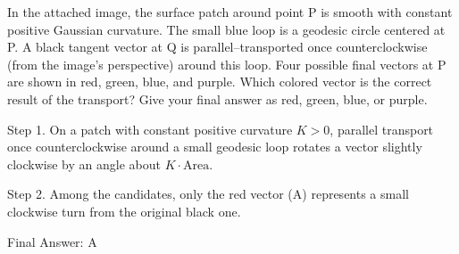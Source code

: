 In the attached image, the surface patch around point P is smooth with constant positive Gaussian curvature. The small blue loop is a geodesic circle centered at P. A black tangent vector at Q is parallel–transported once counterclockwise (from the image's perspective) around this loop. Four possible final vectors at P are shown in red, green, blue, and purple. Which colored vector is the correct result of the transport? Give your final answer as red, green, blue, or purple.

Step 1. On a patch with constant positive curvature $K>0$, parallel transport once counterclockwise around a small geodesic loop rotates a vector slightly clockwise by an angle about $K \cdot \text{Area}$.

Step 2. Among the candidates, only the red vector  (A) represents a small clockwise turn from the original black one.

Final Answer: A